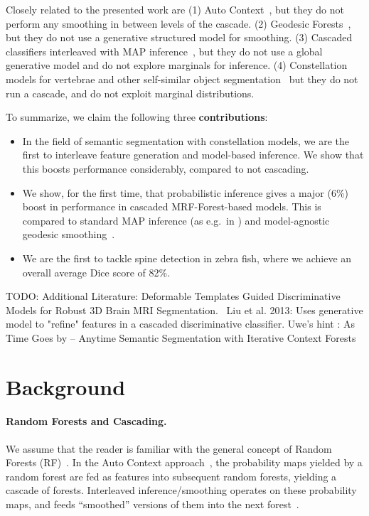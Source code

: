 \documentclass[10pt,twocolumn,letterpaper]{article}
\begin{document}
Closely related to the presented work are 
(1) Auto Context~\cite{AutoContext2008}, but they do not perform any smoothing in between levels of the cascade. 
(2) Geodesic Forests~\cite{GeoForests2013}, but they do not use a generative structured model for smoothing. 
(3) Cascaded classifiers interleaved with MAP inference~\cite{}, but they do not use a global generative model and do not explore marginals for inference. 
(4) Constellation models for vertebrae and other self-similar object segmentation~\cite{Glocker2012,Glocker2013,Klinder2009471,TeethMICCAI2012,WormMiccai2014} but they do not run a cascade, and do not exploit marginal distributions. 

To summarize, we claim the following three {\bf contributions}:
\begin{itemize}
\item In the field of semantic segmentation with constellation models, we are the first to interleave feature generation and model-based inference. We show that this boosts performance considerably, compared to not cascading. 
\item We show, for the first time, that probabilistic inference gives a major (6\%) boost in performance in cascaded MRF-Forest-based models. This is compared to standard MAP inference (as e.g.\ in \cite{Glocker2013,SeifertAnatomicalSPIE2009,TeethMICCAI2012}) and model-agnostic geodesic smoothing~\cite{GeoForests2013,CriminisiAbdominalIPMI2011}. 
\item We are the first to tackle spine detection in zebra fish, where we achieve an overall average Dice score of 82\%.
\end{itemize}



%
TODO: Additional Literature: 
%
Deformable Templates Guided Discriminative Models for Robust 3D Brain MRI Segmentation.~\cite{BrainSeg2013}  Liu et al.  2013: Uses generative model to "refine" features in a cascaded discriminative classifier.
%
Uwe's hint \cite{Denzler2012}: As Time Goes by -- Anytime Semantic Segmentation with Iterative Context Forests

\section{Background}

\paragraph{Random Forests and Cascading. }
We assume that the reader is familiar with the general concept of Random Forests (RF)~\cite{BreimanRF}. 
%
In the Auto Context approach~\cite{AutoContext2008}, the probability maps yielded by a random forest are fed as features into subsequent random forests, yielding a cascade of forests.  
%
Interleaved inference/smoothing operates on these probability maps, and feeds ``smoothed'' versions of them into the next forest~\cite{DTF,RTF,UweCVPR2013,GeoForests2013}. 
%
\end{document}
